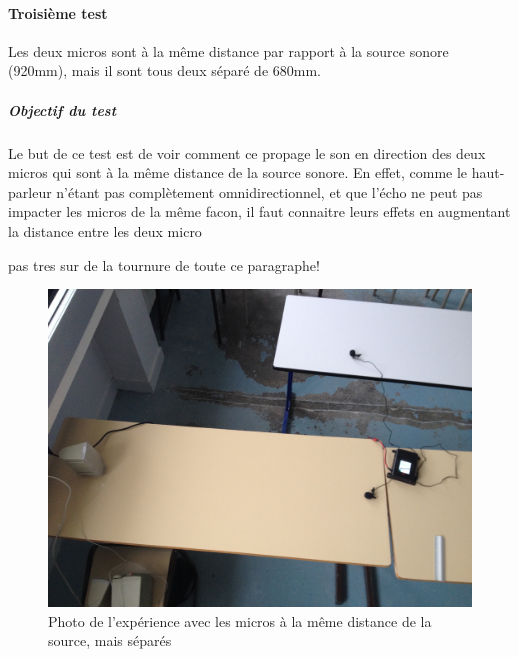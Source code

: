 \documentclass[12pt,a4paper]{report}
\begin{document}
 \paragraph{Troisième test} 
 Les deux micros sont à la même distance par rapport à la source sonore (920mm), mais il sont tous deux séparé de 680mm.
 \subparagraph{Objectif du test}
 Le but de ce test est de voir comment ce propage le son en direction des deux micros qui sont à la même distance de la source sonore. En effet, comme le haut-parleur n'étant pas complètement omnidirectionnel, et que l'écho ne peut pas impacter les micros de la même facon, il faut connaitre leurs effets en augmentant la distance entre les deux micro
 \begin{Large} pas tres sur de la tournure de toute ce paragraphe! \end{Large}
 \begin{figure}[H]
 \includegraphics[width=\textwidth]{../tests/lecture_de_signaux_carres/donnees11-03/test_3.jpg} 
 \caption{Photo de l'expérience avec les micros à la même distance de la source, mais séparés}
 \end{figure}
 
\end{document}

